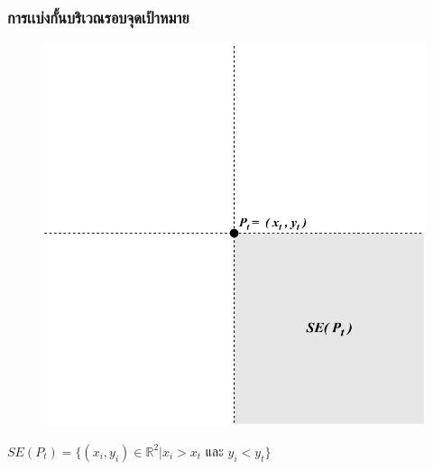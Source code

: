 \documentclass[12pt,aspectratio=169]{beamer}
\begin{document}
\begin{frame}
\frametitle{การเเบ่งกั้นบริเวณรอบจุดเป้าหมาย}
\begin{center}
        \begin{figure}
                    \includegraphics[scale=0.5]{img/SEP_t.pdf}
                \end{figure}
                $SE(P_t) = \{(x_{i} , y_{i}) \in \mathbb{R}^2 | x_{i} > x_{t} \text{ และ } y_{i} < y_{t}\}$
            \end{center}
\end{frame}
\end{document}
